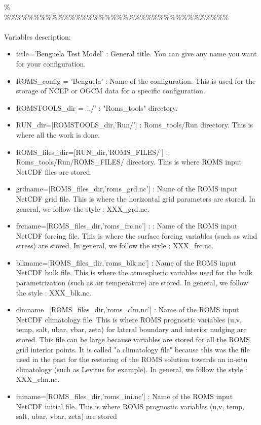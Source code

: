 \%\\
\%\%\%\%\%\%\%\%\%\%\%\%\%\%\%\%\%\%\%\%\%\%\%\%\%\%\%\%\%\%\%\%\%\%\%\%\%\%\\
\\ 
Variables description:
\begin{itemize}
\item title='Benguela Test Model' : General title. You can give any name 
you want for your configuration.
\item ROMS\_config = 'Benguela' : Name of the configuration. This is used for the storage of
NCEP or OGCM data for a specific configuration.
\item ROMSTOOLS\_dir = '../' : "Roms\_tools" directory.
\item RUN\_dir=[ROMSTOOLS\_dir,'Run/'] : Roms\_tools/Run directory. This is where all 
the work is done.
\item ROMS\_files\_dir=[RUN\_dir,'ROMS\_FILES/'] : Roms\_tools/Run/ROMS\_FILES/ directory.
This is where ROMS input NetCDF files are stored.
%
\item grdname=[ROMS\_files\_dir,'roms\_grd.nc'] : Name of the ROMS input NetCDF grid file.
This is where the horizontal grid parameters are stored. In general, we follow 
the style : XXX\_grd.nc.
\item frcname=[ROMS\_files\_dir,'roms\_frc.nc'] : : Name of the ROMS input NetCDF forcing file.
This is where the surface forcing variables (such as wind stress) are stored. In general, we 
follow  the style : XXX\_frc.nc.
\item blkname=[ROMS\_files\_dir,'roms\_blk.nc'] : Name of the ROMS input NetCDF bulk file.
This is where the atmospheric variables used for the bulk parametrization (such as air temperature) 
are stored. In general, we follow  the style : XXX\_blk.nc.
\item clmname=[ROMS\_files\_dir,'roms\_clm.nc'] : Name of the ROMS input NetCDF climatology file.
This is where ROMS prognostic variables (u,v, temp, salt, ubar, vbar, zeta) for lateral boundary 
and interior nudging are stored. This file can be large because variables are stored for all the 
ROMS grid interior points. It is called "a climatology file" because this was the file used in 
the past for the restoring of the ROMS solution towards an in-situ climatology (such as Levitus 
for example). In general, we follow the style : XXX\_clm.nc.
\item ininame=[ROMS\_files\_dir,'roms\_ini.nc'] : Name of the ROMS input NetCDF initial file.
This is where ROMS prognostic variables (u,v, temp, salt, ubar, vbar, zeta) are stored 

\end{itemize}
